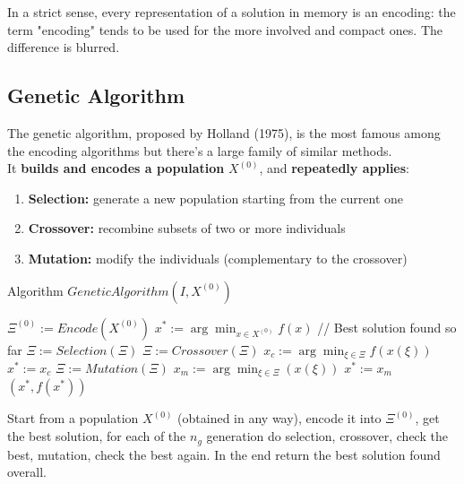 \documentclass[11pt]{article}
\begin{document}
	In a strict sense, every representation of a solution in memory is an encoding: the term "encoding" tends to be used for the more involved and compact ones. The difference is blurred.\\
	
	\newpage
	
	\subsection{Genetic Algorithm}
	
	The genetic algorithm, proposed by Holland (1975), is the most famous among the encoding algorithms but there's a large family of similar methods.\\
	
	It \textbf{builds and encodes a population} $X^{(0)}$, and \textbf{repeatedly applies}:
	\begin{enumerate}
		\item \textbf{Selection:} generate a new population starting from the current one
		\item \textbf{Crossover:} recombine subsets of two or more individuals
		\item \textbf{Mutation:} modify the individuals (complementary to the crossover)
	\end{enumerate}
	
	\nn
	
	\begin{algorithm}[H]
		\caption{Algorithm $GeneticAlgorithm(I , X^{(0)})$}
		\begin{algorithmic}
			\STATE $\Xi^{(0)} := Encode(X^{(0)})$
			\STATE $x^\ast := \arg \min_{x \in X^{(0)}} f(x)$ // Best solution found so far
				\STATE $\Xi := Selection(\Xi)$
				\STATE $\Xi := Crossover(\Xi)$
				\STATE $x_c := \arg \min_{\xi \in \Xi} f (x (\xi))$
					\STATE $x^\ast := x_c$
				\ENDIF
				\STATE $\Xi := Mutation(\Xi)$
				\STATE $x_m := \arg \min_{\xi \in \Xi} (x (\xi))$
					\STATE $x^\ast := x_m$
				\ENDIF
			\ENDFOR
			\RETURN $(x^\ast, f (x^\ast))$
		\end{algorithmic}
	\end{algorithm}
	
	Start from a population $X^{(0)}$ (obtained in any way), encode it into $\Xi^{(0)}$, get the best solution, for each of the $n_g$ generation do selection, crossover, check the best, mutation, check the best again. In the end return the best solution found overall.\\
	
\end{document}
